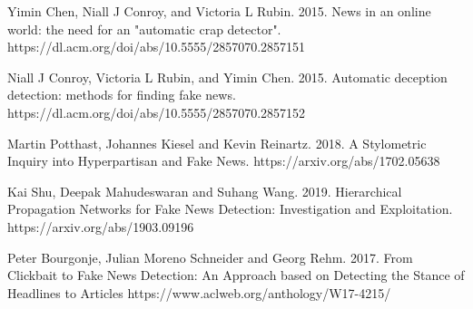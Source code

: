 \documentclass{article}
\begin{document}
        
        \begin{thebibliography}{1}

 Yimin Chen, Niall J Conroy, and Victoria L Rubin. 2015. News in an online world: the need for an "automatic crap detector".
https://dl.acm.org/doi/abs/10.5555/2857070.2857151

 Niall J Conroy, Victoria L Rubin, and Yimin Chen. 2015. Automatic deception detection: methods for finding fake news.
https://dl.acm.org/doi/abs/10.5555/2857070.2857152

 Martin Potthast, Johannes Kiesel and Kevin Reinartz. 2018. A Stylometric Inquiry into Hyperpartisan and Fake News.
https://arxiv.org/abs/1702.05638


 Kai Shu, Deepak Mahudeswaran and Suhang Wang. 2019. Hierarchical Propagation Networks for Fake News Detection: Investigation and Exploitation.
https://arxiv.org/abs/1903.09196

 Peter Bourgonje, Julian Moreno Schneider and Georg Rehm. 2017. From Clickbait to Fake News Detection: An Approach based on Detecting the Stance of Headlines to Articles
https://www.aclweb.org/anthology/W17-4215/

\end{thebibliography}
  
\end{document}
